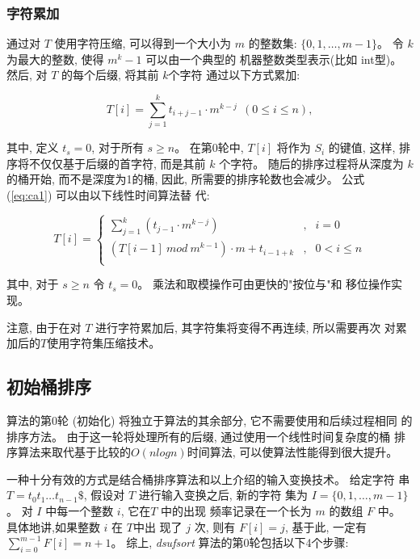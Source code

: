 \subsubsection{字符累加}

通过对 $T$ 使用字符压缩, 可以得到一个大小为 $m$ 的整数集:
$\{0,1,\dots,m-1\}$。 令 $k$ 为最大的整数, 使得 $m^k-1$ 可以由一个典型的
机器整数类型表示(比如 int型)。 然后, 对 $T$ 的每个后缀, 将其前 $k$个字符
通过以下方式累加:

\begin{equation}\label{eq:ca1}
  T[i] = \sum_{j=1}^k t_{i+j-1} \cdot m^{k-j}  ~~(0 \leq i \leq n),
\end{equation}

\noindent 其中, 定义 $t_s = 0$, 对于所有 $s \geq n$。 在第0轮中, $T[i]$
将作为 $S_i$ 的键值, 这样, 排序将不仅仅基于后缀的首字符, 而是其前 $k$
个字符。 随后的排序过程将从深度为 $k$的桶开始, 而不是深度为1的桶, 因此,
所需要的排序轮数也会减少。 公式 (\ref{eq:ca1}) 可以由以下线性时间算法替
代:

\begin{equation}\label{eq:ca2}
 T[i]  = \left\{
  \begin{array}{lll}
    \sum_{j=1}^{k}(t_{j-1} \cdot m^{k-j})  &,  &  i = 0\\
    (T[i-1]~ mod~m^{k-1}) \cdot m + t_{i-1+k} &,  & 0 < i \leq n \\
    \end{array}\right.
\end{equation}

\par\noindent
其中, 对于 $s \geq n$ 令 $t_s = 0$。 乘法和取模操作可由更快的"按位与"和
移位操作实现。

注意, 由于在对 $T$ 进行字符累加后, 其字符集将变得不再连续, 所以需要再次
对累加后的$T$使用字符集压缩技术。

\subsection{初始桶排序}

算法的第0轮 (初始化) 将独立于算法的其余部分, 它不需要使用和后续过程相同
的排序方法。 由于这一轮将处理所有的后缀, 通过使用一个线性时间复杂度的桶
排序算法来取代基于比较的$O(nlogn)$时间算法, 可以使算法性能得到很大提升。

一种十分有效的方式是结合桶排序算法和以上介绍的输入变换技术。 给定字符
串 $T = t_0t_1 \dots t_{n-1}\$$, 假设对 $T$ 进行输入变换之后, 新的字符
集为 $I = \{0,1,\dots,m-1\}$。 对 $I$ 中每一个整数 $i$, 它在$T$ 中的出现
频率记录在一个长为 $m$ 的数组 $F$ 中。 具体地讲,如果整数 $i$ 在 $T$中出
现了 $j$ 次, 则有 $F[i] = j$, 基于此, 一定有 $\sum_{i=0}^{m-1} F[i] =
n + 1$。 综上, \emph{dsufsort} 算法的第0轮包括以下4个步骤:

